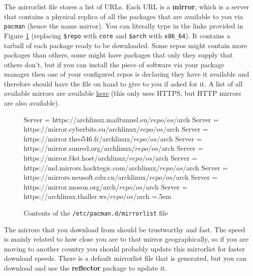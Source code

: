 \documentclass{article}
\theoremstyle{definition}
\newenvironment{cverbatim}
    {\SaveVerbatim{cverb}}
    {\endSaveVerbatim
    \flushleft\fboxrule=0pt\fboxsep=.5em
    \colorbox{cverbbg}{%
      \makebox[\dimexpr\linewidth-2\fboxsep][l]{\BUseVerbatim{cverb}}%
    }
    \endflushleft
  }
\begin{document}
      The mirrorlist file stores a list of URLs. Each URL is a \textbf{mirror}, which is a server that contains a physical replica of all the packages that are available to you via \texttt{pacman} (hence the name mirror). You can literally type in the links provided in Figure \ref{fig:mirrorlist} (replacing \texttt{\$repo} with \texttt{core} and \texttt{\$arch} with \texttt{x86\_64}). It contains a tarball of each package ready to be downloaded. Some repos might contain more packages than others, some might have packages that only they supply that others don’t, but if you can install the piece of software via your package manager then one of your configured repos is declaring they have it available and therefore should have the file on hand to give to you if asked for it. A list of all available mirrors are available \href{https://archlinux.org/mirrorlist/all/https/}{here} (this only uses HTTPS, but HTTP mirrors are also available).  

      \begin{figure}
        \begin{cverbatim}
          Server = https://archlinux.mailtunnel.eu/$repo/os/$arch
          Server = https://mirror.cyberbits.eu/archlinux/$repo/os/$arch
          Server = https://mirror.theo546.fr/archlinux/$repo/os/$arch
          Server = https://mirror.sunred.org/archlinux/$repo/os/$arch
          Server = https://mirror.f4st.host/archlinux/$repo/os/$arch
          Server = https://md.mirrors.hacktegic.com/archlinux/$repo/os/$arch
          Server = https://mirrors.neusoft.edu.cn/archlinux/$repo/os/$arch
          Server = https://mirror.moson.org/arch/$repo/os/$arch
          Server = https://archlinux.thaller.ws/$repo/os/$arch
        \end{cverbatim}
        \caption{Contents of the \texttt{/etc/pacman.d/mirrorlist} file}\label{fig:mirrorlist}
      \end{figure}
      
      The mirrors that you download from should be trustworthy and fast. The speed is mainly related to how close you are to that mirror geographically, so if you are moving to another country you should probably update this mirrorlist for faster download speeds. There is a default mirrorlist file that is generated, but you can download and use the \textbf{reflector} package to update it.  
\end{document}
